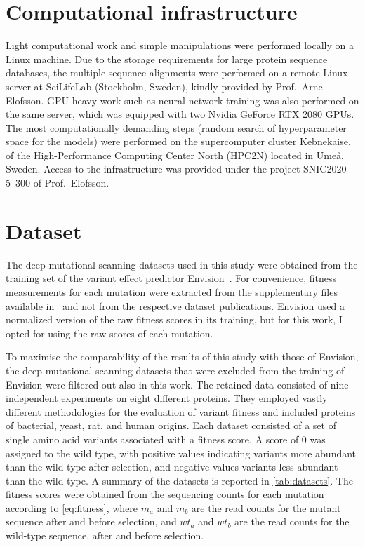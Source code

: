 \section{Computational infrastructure}
Light computational work and simple manipulations were performed locally on a Linux machine.
Due to the storage requirements for large protein sequence databases, the multiple sequence alignments were performed on a remote Linux server at SciLifeLab (Stockholm, Sweden), kindly provided by Prof.~Arne Elofsson.
GPU-heavy work such as neural network training was also performed on the same server, which was equipped with two Nvidia GeForce RTX 2080 GPUs.
The most computationally demanding steps (random search of hyperparameter space for the models) were performed on the supercomputer cluster Kebnekaise, of the High-Performance Computing Center North (HPC2N) located in Umeå, Sweden.
Access to the infrastructure was provided under the project SNIC2020--5--300 of Prof.~Elofsson.

\section{Dataset}\label{sec:mm_dataset}
The deep mutational scanning datasets used in this study were obtained from the training set of the variant effect predictor Envision~\parencite{Gray2018}.
For convenience, fitness measurements for each mutation were extracted from the supplementary files available in~\cite{Gray2018} and not from the respective dataset publications.
Envision used a normalized version of the raw fitness scores in its training, but for this work, I opted for using the raw scores of each mutation.

To maximise the comparability of the results of this study with those of Envision, the deep mutational scanning datasets that were excluded from the training of Envision were filtered out also in this work.
The retained data consisted of nine independent experiments on eight different proteins.
They employed vastly different methodologies for the evaluation of variant fitness and included proteins of bacterial, yeast, rat, and human origins.
Each dataset consisted of a set of single amino acid variants associated with a fitness score.
A score of \num{0} was assigned to the wild type, with positive values indicating variants more abundant than the wild type after selection, and negative values variants less abundant than the wild type.
A summary of the datasets is reported in \autoref{tab:datasets}.
The fitness scores were obtained from the sequencing counts for each mutation according to \autoref{eq:fitness}, where $m_a$ and $m_b$ are the read counts for the mutant sequence after and before selection, and  $wt_a$ and $wt_b$ are the read counts for the wild-type sequence, after and before selection.

